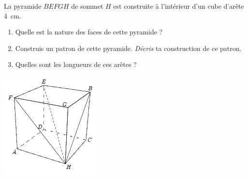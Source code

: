 
\begin{minipage}{0.48\linewidth}
La pyramide $BEFGH$ de sommet $H$ est construite à l'intérieur d'un cube d'arête 4~cm.

\begin{enumerate}
  \item Quelle est la nature des faces de cette pyramide ?
  \item Construis un patron de cette pyramide. {\em Décris} ta
    construction de ce patron.
  \item Quelles sont les longueurs de ces arêtes ?
\end{enumerate}
\end{minipage}
\hfill
\begin{minipage}{0.48\linewidth}
\includegraphics[scale=1]{RepS-53.png} 
\end{minipage}
